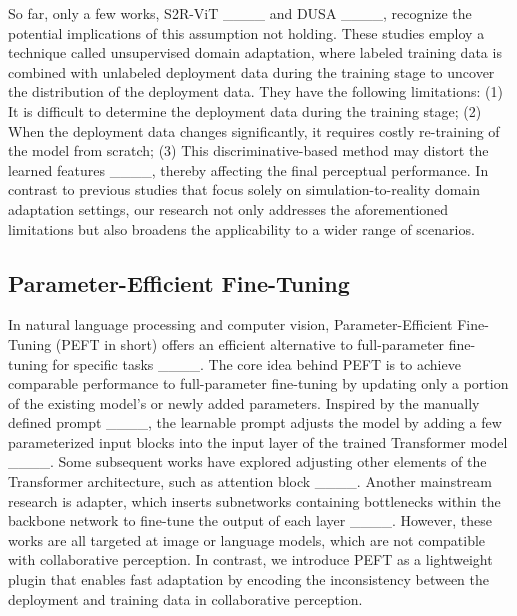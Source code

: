 
So far, only a few works, S2R-ViT ____ and DUSA ____, recognize the potential implications of this assumption not holding. These studies employ a technique called unsupervised domain adaptation, where labeled training data is combined with unlabeled deployment data during the training stage to uncover the distribution of the deployment data. They have the following limitations: (1) It is difficult to determine the deployment data during the training stage; (2) When the deployment data changes significantly, it requires costly re-training of the model from scratch; (3) This discriminative-based method may  distort the learned features ____, thereby affecting the final perceptual performance. In contrast to previous studies that focus solely on simulation-to-reality domain adaptation settings, our research not only addresses the aforementioned limitations but also broadens the applicability to a wider range of scenarios.


\subsection{Parameter-Efficient Fine-Tuning}
In natural language processing and computer vision, Parameter-Efficient Fine-Tuning (PEFT in short) offers an efficient alternative to full-parameter fine-tuning for specific tasks ____. The core idea behind PEFT is to achieve comparable performance to full-parameter fine-tuning by updating only a portion of the existing model's or newly added parameters. Inspired by the manually defined prompt ____, the learnable prompt adjusts the model by adding a few parameterized input blocks into the input layer of the trained Transformer model ____. Some subsequent works have explored adjusting other elements of the Transformer architecture, such as attention block ____. Another mainstream research is adapter, which inserts subnetworks containing bottlenecks within the backbone network to fine-tune the output of each layer ____. However, these works are all targeted at image or language models, which are not compatible with collaborative perception. In contrast, we introduce PEFT as a lightweight plugin that enables fast adaptation by encoding the inconsistency between the deployment and training data in collaborative perception.

